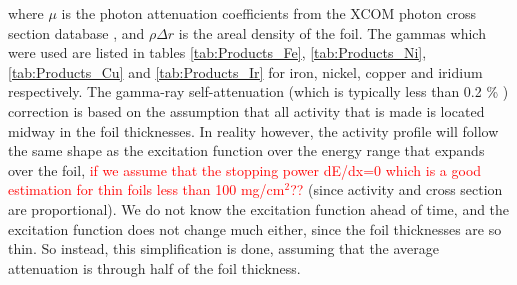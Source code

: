 where $\mu$ is the photon attenuation coefficients from the XCOM photon cross section database \cite{M.J.BergerJ.H.HubbellS.M.SeltzerJ.ChangJ.S.CourseyR.SukumarD.S.Zucker2010}%
, and $\rho\Delta r$ is the areal density of the foil. The gammas which were used are listed in tables \ref{tab:Products_Fe}, \ref{tab:Products_Ni}, \ref{tab:Products_Cu} and \ref{tab:Products_Ir} for iron, nickel, copper and iridium respectively. The gamma-ray self-attenuation (which is typically less than 0.2 \% \cite{Voyles2019}) correction is based on the assumption that all activity that is made is located midway in the foil thicknesses. In reality however, the activity profile will follow the same shape as the excitation function over the energy range that expands over the foil, \textcolor{red}{if we assume that the stopping power dE/dx=0 which is a good estimation for thin foils less than 100 mg/cm$^2$??} (since activity and cross section are proportional). We do not know the excitation function ahead of time, and the excitation function does not change much either, since the foil thicknesses are so thin. So instead, this simplification is done, assuming that the average attenuation is through half of the foil thickness. \\ 

